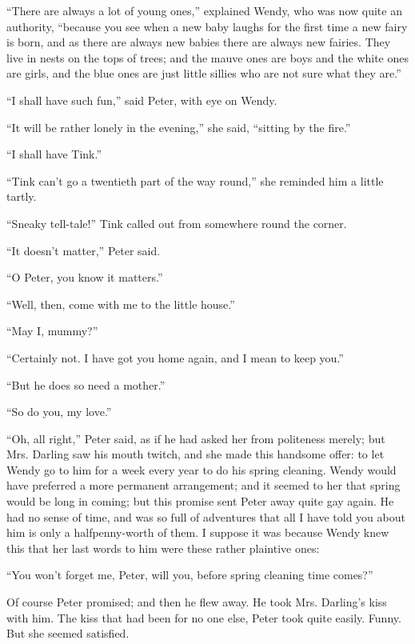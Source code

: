``There are always a lot of young ones,'' explained Wendy, who was now
quite an authority, ``because you see when a new baby laughs for the
first time a new fairy is born, and as there are always new babies
there are always new fairies. They live in nests on the tops of trees;
and the mauve ones are boys and the white ones are girls, and the blue
ones are just little sillies who are not sure what they are.''

``I shall have such fun,'' said Peter, with eye on Wendy.

``It will be rather lonely in the evening,'' she said, ``sitting by the
fire.''

``I shall have Tink.''

``Tink can't go a twentieth part of the way round,'' she reminded him a
little tartly.

``Sneaky tell-tale!'' Tink called out from somewhere round the corner.

``It doesn't matter,'' Peter said.

``O Peter, you know it matters.''

``Well, then, come with me to the little house.''

``May I, mummy?''

``Certainly not. I have got you home again, and I mean to keep you.''

``But he does so need a mother.''

``So do you, my love.''

``Oh, all right,'' Peter said, as if he had asked her from politeness
merely; but Mrs. Darling saw his mouth twitch, and she made this
handsome offer: to let Wendy go to him for a week every year to do his
spring cleaning. Wendy would have preferred a more permanent
arrangement; and it seemed to her that spring would be long in coming;
but this promise sent Peter away quite gay again. He had no sense of
time, and was so full of adventures that all I have told you about him
is only a halfpenny-worth of them. I suppose it was because Wendy knew
this that her last words to him were these rather plaintive ones:

``You won't forget me, Peter, will you, before spring cleaning time
comes?''

Of course Peter promised; and then he flew away. He took Mrs. Darling's
kiss with him. The kiss that had been for no one else, Peter took quite
easily. Funny. But she seemed satisfied.

